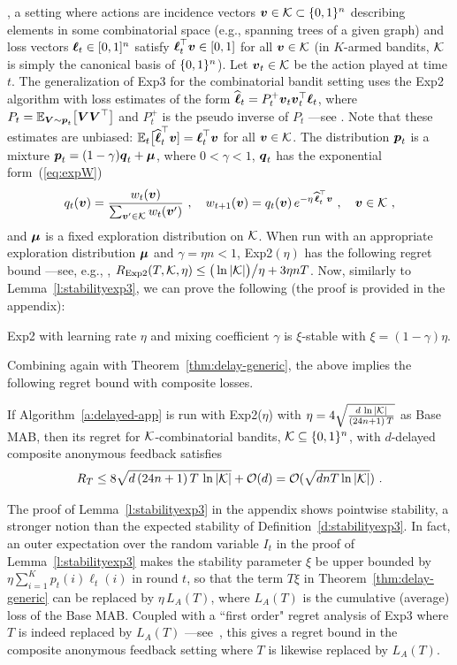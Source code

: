\citep{cesa2012combinatorial}, a setting where actions are incidence
vectors $\boldsymbol{v}\in\mathcal{K}\subset\{0,1\}^n$ describing elements in some
combinatorial space (e.g., spanning trees of a given graph) and loss
vectors $\boldsymbol{\ell}_t \in [0,1]^n$ satisfy $\boldsymbol{\ell}_t^{\top}\boldsymbol{v} \in
[0,1]$ for all $\boldsymbol{v}\in\mathcal{K}$ (in $K$-armed bandits, $\mathcal{K}$ is simply
the canonical basis of $\{0,1\}^n$). Let $\boldsymbol{v}_t\in\mathcal{K}$ be the action
played at time $t$. The generalization of Exp3 for the combinatorial
bandit setting uses the Exp2 algorithm with loss estimates of the
form $\widehat{\boldsymbol{\ell}}_t = P_t^+ \boldsymbol{v}_t \boldsymbol{v}_t^{\top} \boldsymbol{\ell}_t$, where $P_t =
\mathbb{E}_{\boldsymbol{V} \sim \boldsymbol{p}_t}\bigl[\boldsymbol{V} \boldsymbol{V}^{\top}\bigr]$ and $P_t^+$ is the
pseudo inverse of $P_t$ ---see \citep{dani2008price}. Note that
these estimates are unbiased: $\mathbb{E}_t\big[\widehat{\boldsymbol{\ell}}_t^{\top}\boldsymbol{v}] =
\boldsymbol{\ell}_t^{\top}\boldsymbol{v}$ for all $\boldsymbol{v}\in\mathcal{K}$. The distribution $\boldsymbol{p}_t$
is a mixture $\boldsymbol{p}_t = (1-\gamma)\boldsymbol{q}_t + \boldsymbol{\mu}$, where $0 < \gamma <
1$, $\boldsymbol{q}_t$ has the exponential form~(\ref{eq:expW})
\[
    q_t(\boldsymbol{v}) = \frac{w_t(\boldsymbol{v})}{\sum_{\boldsymbol{v}'\in\mathcal{K}} w_t(\boldsymbol{v}')}~,
\quad
    w_{t+1}(\boldsymbol{v})
=
    q_t(\boldsymbol{v})\,e^{-\eta\,\widehat{\boldsymbol{\ell}}_t^{\top}\boldsymbol{v}}~,
\quad
    \boldsymbol{v}\in\mathcal{K}~,
\]
and $\boldsymbol{\mu}$ is a fixed exploration distribution on $\mathcal{K}$. When run with an appropriate exploration distribution $\boldsymbol{\mu}$ and $\gamma = \eta n < 1$, Exp2$(\eta)$ has the following regret bound ---see, e.g., \citep[Theorem~4]{bubeck2012towards},
$
    R_{\mathrm{Exp2}}(T,\mathcal{K},\eta) \le \big(\ln|\mathcal{K}|\big)\big/{\eta} + 3\eta nT
$.
Now, similarly to Lemma~\ref{l:stabilityexp3}, we can prove the following (the proof is provided in the appendix):
%
\begin{lemma}
\label{l:stabExp2}
Exp2 with learning rate $\eta$ and mixing coefficient $\gamma$ is $\xi$-stable with $\xi = (1-\gamma)\eta$.
\end{lemma}
%
Combining again with Theorem~\ref{thm:delay-generic}, the above implies the following regret bound with composite losses.
%
\begin{corollary}
\label{c:delayExp2}
If Algorithm~\ref{a:delayed-app} is run with Exp2($\eta$) with $\eta = 4\sqrt{\frac{d\,\ln|\mathcal{K}|}{(24n+1)\,T}}$ as Base MAB, then its regret for $\mathcal{K}$-combinatorial bandits, $\mathcal{K} \subseteq \{0,1\}^n$, with $d$-delayed composite anonymous feedback satisfies
\[
    R_T
\le
    8\sqrt{d\,(24n+1)\,T\,\ln|\mathcal{K}|} + \mathcal{O}(d) = \mathcal{O}(\sqrt{dnT\ln|\mathcal{K}|})~.
\]
\end{corollary}
%
\begin{remark}\label{r:firstorderbound}
The proof of Lemma~\ref{l:stabilityexp3} in the appendix shows pointwise stability, a stronger notion than the expected stability of Definition~\ref{d:stabilityexp3}. In fact, an outer expectation over the random variable $I_t$ in the proof of Lemma~\ref{l:stabilityexp3} makes the stability parameter $\xi$ be upper bounded by $\eta\sum_{i=1}^K p_{t}(i)\ell_{t}(i)$ in round $t$, so that the term $T\xi$ in Theorem~\ref{thm:delay-generic} can be replaced by $\eta\,L_A(T)$, where $L_A(T)$ is the cumulative (average) loss of the Base MAB. Coupled with a ``first order" regret analysis of Exp3 where $T$ is indeed replaced by $L_A(T)$ ---see~\citep[Theorem~2]{allenberg2006hannan}, this gives a regret bound in the composite anonymous feedback setting where $T$ is likewise replaced by $L_A(T)$.
\end{remark}
